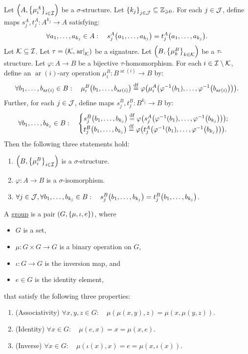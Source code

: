 \documentclass[11pt,reqno]{amsart}
\DeclareMathOperator{\ar}{ar}
\newcommand{\K}{\mathcal{K}}
\renewcommand{\phi}{\varphi}
\begin{document}
\begin{corollary}
\label{partial}
Let $\Br{A,\set{\mu_i^A}_{i\in\I}}$ be a $\sigma$-structure.
Let $\set{k_j}_{j\in\J}\subseteq\Z_{\ge0}$.
For each $j\in\mathcal{J}$, define maps $s_j^A,t_j^A:A^{k_j}\to A$
satisfying:
\[\forall a_1,\dots,a_{k_j}\in A:\quad
s_j^A\Br{a_1,\dots,a_{k_j}}=t_j^A\Br{a_1,\dots,a_{k_j}}.
\]
Let $\K\subseteq\I$.
Let $\tau=\Br{\K,\eval{\ar}_\K}$ be a signature.
Let $\Br{B,\set{\mu_k^B}_{k\in\K}}$ be a $\tau$-structure.
Let $\phi:A\to B$ be a bijective $\tau$-homomorphism.
For each $i\in\I\setminus\K$, define an $\ar(i)$-ary operation
$\mu_i^B:B^{\ar(i)}\to B$ by:
\[\forall b_1,\dots,b_{\ar(i)}\in B:\quad
\mu_i^B\Br{b_1,\dots,b_{\ar(i)}}\df
\phi\Br{\mu_i^A\Br{\phi\inv(b_1),\dots,\phi\inv\Br{b_{\ar(i)}}}}.
\]
Further, for each $j\in\mathcal{J}$, define maps
$s_j^B,t_j^B:B^{k_j}\to B$ by:
\[
\forall b_1,\dots,b_{k_j}\in B:\quad
\begin{cases}
s_j^B\Br{b_1,\dots,b_{k_j}}
\df\phi\Br{s_j^A\Br{\phi\inv(b_1),\dots,\phi\inv\Br{b_{k_j}}}};\\
t_j^B\Br{b_1,\dots,b_{k_j}}
\df\phi\Br{t_j^A\Br{\phi\inv(b_1),\dots,\phi\inv\Br{b_{k_j}}}}.\\
\end{cases}
\]
Then the following three statements hold:
\begin{enumerate}
\item $\Br{B,\set{\mu_i^B}_{i\in\I}}$ is a $\sigma$-structure.
\item $\phi:A\to B$ is a $\sigma$-isomorphism.
\item $\forall j\in\J,\forall b_1,\dots,b_{k_j}\in B:\quad
s_j^B\Br{b_1,\dots,b_{k_j}}=t_j^B\Br{b_1,\dots,b_{k_j}}$.
\end{enumerate}
\end{corollary}
\begin{Def}
A \ul{group} is a pair $(G,\set{\mu,\iota,e})$, where
\begin{itemize}
\item $G$ is a set,
\item $\mu:G\times G\to G$ is a binary operation on $G$,
\item $\iota:G\to G$ is the inversion map, and
\item $e\in G$ is the identity element,
\end{itemize}
that satisfy the following three properties:
\begin{enumerate}
\item(Associativity)
$\forall x,y,z\in G:\quad\mu(\mu(x,y),z)=\mu(x,\mu(y,z))$.
\item(Identity)
$\forall x\in G:\quad\mu(e,x)=x=\mu(x,e)$.
\item(Inverse)
$\forall x\in G:\quad\mu(\iota(x),x)=e=\mu(x,\iota(x))$.
\end{enumerate}
\end{Def}
\end{document}
